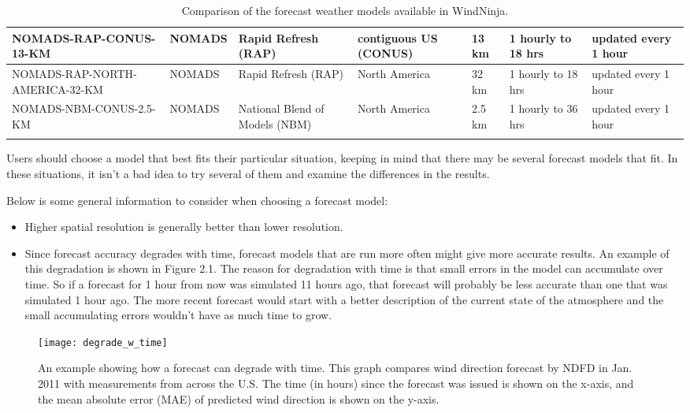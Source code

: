 \documentclass[12pt]{article}
\begin{document}
\begin{landscape}
\begin{longtable}[1]{|p{4.0cm}|p{2.0cm}|p{2.2cm}|p{2.0cm}|p{2.2cm}|p{3.4cm}|p{3.6cm}|}
\hline
NOMADS-RAP-CONUS-13-KM & NOMADS & Rapid Refresh (RAP) & contiguous US (CONUS) & 13 km & 1 hourly to 18 hrs & updated every 1 hour\\
\hline
NOMADS-RAP-NORTH-AMERICA-32-KM & NOMADS & Rapid Refresh (RAP) & North America & 32 km & 1 hourly to 18 hrs & updated every 1 hour\\
\hline
NOMADS-NBM-CONUS-2.5-KM & NOMADS & National Blend of Models (NBM) & North America & 2.5 km & 1 hourly to 36 hrs & updated every 1 hour\\
\hline
\caption{Comparison of the forecast weather models available in WindNinja.}
\end{longtable}
\end{landscape}

Users should choose a model that best fits their particular situation, keeping in mind that there may be several forecast models that fit.  In these situations, it isn't a bad idea to try several of them and examine the differences in the results.


Below is some general information to consider when choosing a forecast model:
\begin{itemize}
\item Higher spatial resolution is generally better than lower resolution.
\item Since forecast accuracy degrades with time, forecast models that are run more often might give more accurate results.  An example of this degradation is shown in Figure 2.1.  The reason for degradation with time is that small errors in the model can accumulate over time.  So if a forecast for 1 hour from now was simulated 11 hours ago, that forecast will probably be less accurate than one that was simulated 1 hour ago.  The more recent forecast would start with a better description of the current state of the atmosphere and the small accumulating errors wouldn't have as much time to grow.
\end{itemize}


\begin{figure}[H]
	\centering
	\label{ndfd_degrade}
	\texttt{[image: degrade\_w\_time]}
	\caption*{An example showing how a forecast can degrade with time.  This graph compares wind direction forecast by NDFD in Jan. 2011 with measurements from across the U.S.  The time (in hours) since the forecast was issued is shown on the x-axis, and the mean absolute error (MAE) of predicted wind direction is shown on the y-axis.}
\end{figure}
\end{document}
